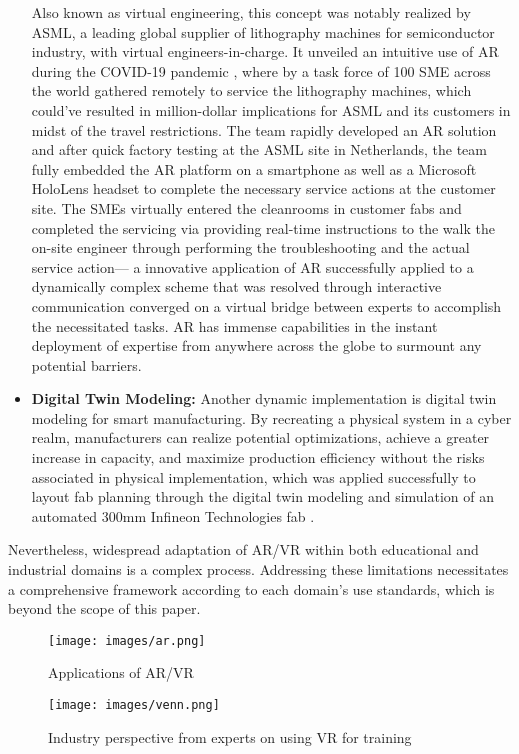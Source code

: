 \begin{itemize}
Also known as virtual engineering, this concept was notably realized by ASML, a leading global supplier of lithography machines for semiconductor industry, with virtual engineers-in-charge. It unveiled an intuitive use of AR during the COVID-19 pandemic \cite{asml2020}, where by a task force of 100 SME across the world gathered remotely to service the lithography machines, which could’ve resulted in million-dollar implications for ASML and its customers in midst of the travel restrictions. The team rapidly developed an AR solution and after quick factory testing at the ASML site in Netherlands, the team fully embedded the AR platform on a smartphone as well as a Microsoft HoloLens headset to complete the necessary service actions at the customer site. The SMEs virtually entered the cleanrooms in customer fabs and completed the servicing via providing real-time instructions to the walk the on-site engineer through performing the troubleshooting and the actual service action— a innovative application of AR successfully applied to a dynamically complex scheme that was resolved through interactive communication converged on a virtual bridge between experts to accomplish the necessitated tasks. AR has immense capabilities in the instant deployment of expertise from anywhere across the globe to surmount any potential barriers.  
    
    \item \textbf{Digital Twin Modeling:} Another dynamic implementation is digital twin modeling for smart manufacturing. By recreating a physical system in a cyber realm, manufacturers can realize potential optimizations, achieve a greater increase in capacity, and maximize production efficiency without the risks associated in physical implementation, which was applied successfully to layout fab planning through the digital twin modeling and simulation of an automated 300mm Infineon Technologies fab \cite{Heinrich2012RulesOA}.
\end{itemize}

Nevertheless, widespread adaptation of AR/VR within both educational and industrial domains is a complex process. Addressing these limitations necessitates a comprehensive framework according to each domain's use standards, which is beyond the scope of this paper. 

\begin{figure}
    \texttt{[image: images/ar.png]}
    \caption{Applications of AR/VR}\label{fig:7}
\end{figure}

\begin{figure*}
    \centering
    \texttt{[image: images/venn.png]}
    \caption{Industry perspective from experts on using VR for training}
    \label{fig:8}
\end{figure*}


